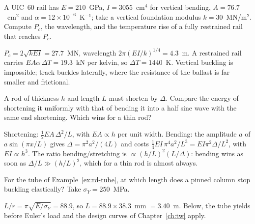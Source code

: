 \label{exo:rd-rail}
%
A UIC~60 rail has $E = 210$~GPa, $I = 3055$~cm$^4$ for vertical bending, $A = 76.7$~cm$^2$ and
$\alpha = 12\times10^{-6}$~K$^{-1}$; take a vertical foundation modulus $k = 30$~MN/m$^2$. Compute
$P_c$, the wavelength, and the temperature rise of a fully restrained rail that reaches $P_c$.
\begin{solution}
$P_c = 2\sqrt{kEI} = 27.7$~MN, wavelength $2\pi(EI/k)^{1/4} = 4.3$~m. A restrained rail carries
$EA\alpha\,\Delta T = 19.3$~kN per kelvin, so $\Delta T = 1440$~K. Vertical buckling is impossible; track
buckles laterally, where the resistance of the ballast is far smaller and frictional.
\end{solution}

\label{exo:rd-bend}
%
A rod of thickness $h$ and length $L$ must shorten by $\Delta$. Compare the energy of shortening
it uniformly with that of bending it into a half sine wave with the same end shortening. Which
wins for a thin rod?
\begin{solution}
Shortening: $\tfrac12 EA\,\Delta^2/L$, with $EA \propto h$ per unit width. Bending: the amplitude $a$
of $a\sin(\pi x/L)$ gives $\Delta = \pi^2a^2/(4L)$ and costs $\tfrac14 EI\,\pi^4a^2/L^3 = EI\pi^2\Delta/L^2$, with
$EI \propto h^3$. The ratio bending/stretching is $\propto (h/L)^2(L/\Delta)$: bending wins as soon as
$\Delta/L \gg (h/L)^2$, which for a thin rod is almost always.
\end{solution}

\label{exo:rd-yield}
%
For the tube of Example~\ref{ex:rd-tube}, at which length does a pinned column stop buckling
elastically? Take $\sigma_Y = 250$~MPa.
\begin{solution}
$L/r = \pi\sqrt{E/\sigma_Y} = 88.9$, so $L = 88.9 \times 38.3$~mm $= 3.40$~m. Below, the tube yields
before Euler's load and the design curves of Chapter~\ref{ch:tw} apply.
\end{solution}


